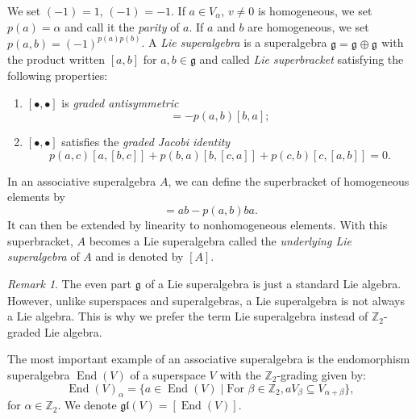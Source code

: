 \documentclass[a4paper, 12pt, reqno]{amsart}
\theoremstyle{remark}
\newtheorem{remark}[theorem]{Remark}
\numberwithin{equation}{subsection}
\DeclareMathOperator{\End}{End}
\DeclareMathOperator{\zero}{\overline{0}}
\DeclareMathOperator{\one}{\overline{1}}
\begin{document}
We set $(-1)^{\zero} = 1$, $(-1)^{\one} = -1$.
If $a \in V_\alpha$, $v\neq 0$ is homogeneous, we set $p(a) = \alpha$ and call it the \emph{parity} of $a$.
If $a$ and $b$ are homogeneous, we set $p(a, b) = (-1)^{p(a)p(b)}$.
A \emph{Lie superalgebra} is a superalgebra $\mathfrak{g} = \mathfrak{g}_{\zero} \oplus \mathfrak{g}_{\one}$ with the product written $[a, b]$ for $a, b \in \mathfrak{g}$ and called \emph{Lie superbracket} satisfying the following properties:
\begin{enumerate}
\item $[\bullet, \bullet]$ is \emph{graded antisymmetric}
  \begin{equation*}
    [a, b] = -p(a, b)[b, a];
  \end{equation*}
\item $[\bullet, \bullet]$ satisfies the \emph{graded Jacobi identity}
  \begin{equation*}
    p(a, c)[a, [b, c]] + p(b, a)[b, [c, a]] + p(c, b)[c, [a, b]] = 0.
  \end{equation*}
\end{enumerate}

In an associative superalgebra $A$, we can define the superbracket of homogeneous elements by
\begin{equation*}
  [a, b] = ab - p(a, b)ba.
\end{equation*}
It can then be extended by linearity to nonhomogeneous elements.
With this superbracket, $A$ becomes a Lie superalgebra called the \emph{underlying Lie superalgebra} of $A$ and is denoted by $[A]$.

\begin{remark}
  \label{rmk:1}
  The even part $\mathfrak{g}_{\zero}$ of a Lie superalgebra is just a standard Lie algebra.
  However, unlike superspaces and superalgebras, a Lie superalgebra is not always a Lie algebra.
  This is why we prefer the term Lie superalgebra instead of $\mathbb{Z}_2$-graded Lie algebra.
\end{remark}

The most important example of an associative superalgebra is the endomorphism superalgebra $\End(V)$ of a superspace $V$ with the $\mathbb{Z}_2$-grading given by:
\begin{equation*}
  \End(V)_{\alpha} = \{a \in \End(V) \mid \text{For }\beta \in \mathbb{Z}_2, aV_\beta \subseteq V_{\alpha + \beta}\},
\end{equation*}
for $\alpha \in \mathbb{Z}_2$.
We denote $\mathfrak{gl}(V) = [\End(V)]$.
\end{document}
